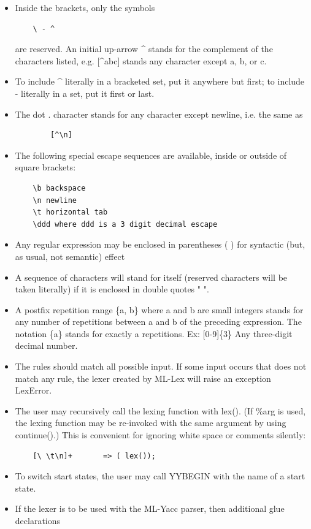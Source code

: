 \documentclass[8pt, a4paper, oneside, twocolumn]{extarticle}
\begin{document}
\begin{itemize}
    \item Inside the brackets, only the symbols \begin{verbatim} 
    \ - ^ 
\end{verbatim}
 are reserved. An initial up-arrow \^{} stands for the complement of the characters listed, e.g. [\^{}abc] stands any character except a, b, or c.
    \item  To include \^{} literally in a bracketed set, put it anywhere but first; to include - literally in a set, put it first or last. 
    \item The dot . character stands for any character except newline, i.e. the same as \begin{verbatim}
        [^\n]
    \end{verbatim}
    \item The following special escape sequences are available, inside or outside of square brackets: 
    \begin{verbatim}
    \b backspace
    \n newline
    \t horizontal tab
    \ddd where ddd is a 3 digit decimal escape
    \end{verbatim}
    \item Any regular expression may be enclosed in parentheses ( ) for syntactic (but, as
    usual, not semantic) effect
    \item A sequence of characters will stand for itself (reserved characters will be taken literally) if it is enclosed in double quotes " ".
    \item A postfix repetition range \{a, b\} where a and b are small integers stands for any number of repetitions between a and b of the preceding expression. The notation \{a\} stands for exactly a repetitions. Ex: [0-9]\{3\}
    Any three-digit decimal number. 
    \item The rules should match all possible input. If some input occurs that does not match any rule, the lexer created by ML-Lex will raise an exception LexError.
    \item  The user may recursively call the lexing function with lex(). (If \%arg is used, the lexing function may be re-invoked with the same argument by using continue().) This is convenient for ignoring white space or comments silently:
    \begin{verbatim}
    [\ \t\n]+       => ( lex());
    \end{verbatim}
    \item To switch start states, the user may call YYBEGIN with the name of a start state. 
    \item If the lexer is to be used with the ML-Yacc parser, then additional glue declarations

\end{itemize}
\end{document}
